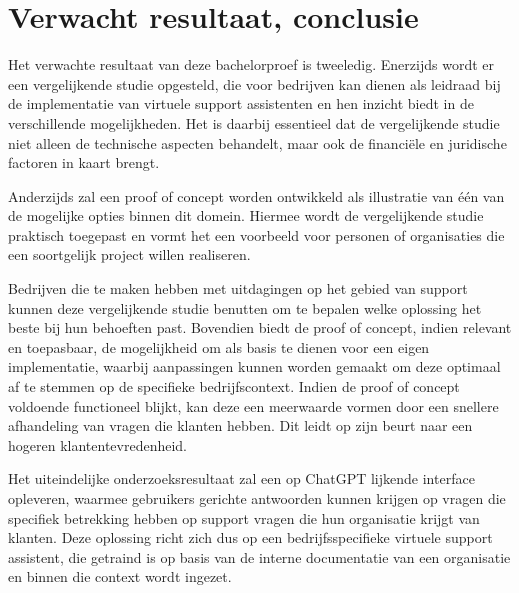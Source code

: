 \section{Verwacht resultaat, conclusie}%
\label{sec:verwachte_resultaten}

Het verwachte resultaat van deze bachelorproef is tweeledig. Enerzijds wordt er een vergelijkende studie opgesteld, die voor bedrijven kan dienen als leidraad bij de implementatie van virtuele support assistenten en hen inzicht biedt in de verschillende mogelijkheden. Het is daarbij essentieel dat de vergelijkende studie niet alleen de technische aspecten behandelt, maar ook de financiële en juridische factoren in kaart brengt.

Anderzijds zal een proof of concept worden ontwikkeld als illustratie van één van de mogelijke opties binnen dit domein. Hiermee wordt de vergelijkende studie praktisch toegepast en vormt het een voorbeeld voor personen of organisaties die een soortgelijk project willen realiseren.

Bedrijven die te maken hebben met uitdagingen op het gebied van support kunnen deze vergelijkende studie benutten om te bepalen welke oplossing het beste bij hun behoeften past. Bovendien biedt de proof of concept, indien relevant en toepasbaar, de mogelijkheid om als basis te dienen voor een eigen implementatie, waarbij aanpassingen kunnen worden gemaakt om deze optimaal af te stemmen op de specifieke bedrijfscontext. Indien de proof of concept voldoende functioneel blijkt, kan deze een meerwaarde vormen door een snellere afhandeling van vragen die klanten hebben. Dit leidt op zijn beurt naar een hogeren klantentevredenheid. 

Het uiteindelijke onderzoeksresultaat zal een op ChatGPT lijkende interface opleveren, waarmee gebruikers gerichte antwoorden kunnen krijgen op vragen die specifiek betrekking hebben op support vragen die hun organisatie krijgt van klanten. Deze oplossing richt zich dus op een bedrijfsspecifieke virtuele support assistent, die getraind is op basis van de interne documentatie van een organisatie en binnen die context wordt ingezet.




